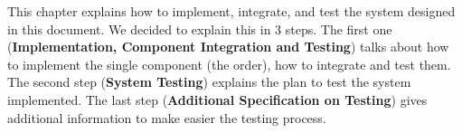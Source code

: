 This chapter explains how to implement, integrate, and test the system designed in this document. We decided to explain this in 3 steps. The first one (\textbf{Implementation, Component Integration and Testing}) talks about how to implement the single component (the order), how to integrate and test them.
The second step (\textbf{System Testing}) explains the plan to test the system implemented. The last step (\textbf{Additional Specification on Testing}) gives additional information to make easier the testing process.